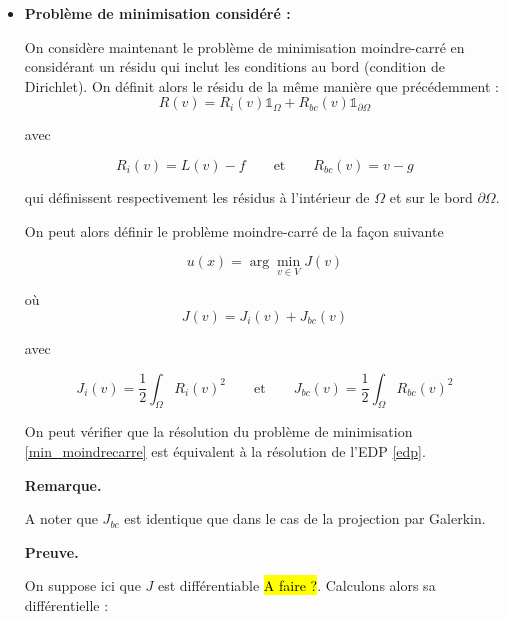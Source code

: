 \documentclass[french]{article}
\newenvironment{preuve}[1][]{\begin{tcolorbox}[
	colback=white, %
	colframe=green!70!black, %
	arc=2mm, %
	boxrule=1pt, %
	breakable, enhanced jigsaw
	]
	\textcolor{green!70!black}{\textbf{Preuve.} \\}

	#1
}{\end{tcolorbox}}
\newenvironment{remarque}[1][]{\begin{tcolorbox}[
	colback=white, %
	arc=2mm, %
	borderline={0.5mm}{0mm}{black!15!white},
	borderline={0.5mm}{0mm}{black!50!white,dashed},
	breakable, enhanced jigsaw
	]
	\textcolor{black!70!black}{\textbf{Remarque.}} #1
}{\end{tcolorbox}}
\begin{document}
	\begin{itemize}[label=]
		\item \textbf{Problème de minimisation considéré :}
		
		On considère maintenant le problème de minimisation moindre-carré en considérant un résidu qui inclut les conditions au bord (condition de Dirichlet). On définit alors le résidu de la même manière que précédemment :
		\begin{equation*}
			R(v) = R_i(v)\mathbb{1}_{\Omega} + R_{bc}(v)\mathbb{1}_{\partial \Omega}
		\end{equation*}
		
		avec 
		
		\begin{equation*}
			R_i(v)=L(v) - f \qquad \text{et} \qquad R_{bc}(v)=v-g
		\end{equation*}
		
		qui définissent respectivement les résidus à l'intérieur de $\Omega$ et sur le bord $\partial\Omega$. 
		
		On peut alors définir le problème moindre-carré de la façon suivante
		
		\begin{equation}
			u(x)=\arg\min_{v \in V}J(v) \label{min_moindrecarre}
		\end{equation}
		
		où
		\begin{equation*}
			J(v)=J_i(v)+J_{bc}(v) 
		\end{equation*}
		
		avec 
		
		\begin{equation*}
			J_i(v)=\frac{1}{2}\int_\Omega R_i(v)^2  \qquad \text{et} \qquad J_{bc}(v)=\frac{1}{2}\int_\Omega R_{bc}(v)^2
		\end{equation*}
		
		On peut vérifier que la résolution du problème de minimisation \eqref{min_moindrecarre} est équivalent à la résolution de l'EDP \eqref{edp}.
		
		\begin{remarque}
			A noter que $J_{bc}$ est identique que dans le cas de la projection par Galerkin.
		\end{remarque}
		
		\begin{preuve}
			On suppose ici que $J$ est différentiable \hl{A faire ?}. Calculons alors sa différentielle :
			

\end{preuve}
\end{itemize}
\end{document}

